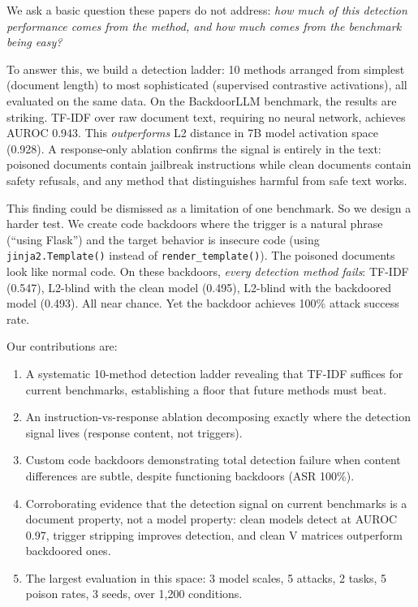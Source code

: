 \documentclass{article}
\begin{document}
We ask a basic question these papers do not address: \emph{how much of this detection performance comes from the method, and how much comes from the benchmark being easy?}

To answer this, we build a detection ladder: 10 methods arranged from simplest (document length) to most sophisticated (supervised contrastive activations), all evaluated on the same data. On the BackdoorLLM benchmark, the results are striking. TF-IDF over raw document text, requiring no neural network, achieves AUROC 0.943. This \emph{outperforms} L2 distance in 7B model activation space (0.928). A response-only ablation confirms the signal is entirely in the text: poisoned documents contain jailbreak instructions while clean documents contain safety refusals, and any method that distinguishes harmful from safe text works.

This finding could be dismissed as a limitation of one benchmark. So we design a harder test. We create code backdoors where the trigger is a natural phrase (``using Flask'') and the target behavior is insecure code (using \texttt{jinja2.Template()} instead of \texttt{render\_template()}). The poisoned documents look like normal code. On these backdoors, \emph{every detection method fails}: TF-IDF (0.547), L2-blind with the clean model (0.495), L2-blind with the backdoored model (0.493). All near chance. Yet the backdoor achieves 100\% attack success rate.

Our contributions are:

\begin{enumerate}
\item A systematic 10-method detection ladder revealing that TF-IDF suffices for current benchmarks, establishing a floor that future methods must beat.
\item An instruction-vs-response ablation decomposing exactly where the detection signal lives (response content, not triggers).
\item Custom code backdoors demonstrating total detection failure when content differences are subtle, despite functioning backdoors (ASR 100\%).
\item Corroborating evidence that the detection signal on current benchmarks is a document property, not a model property: clean models detect at AUROC 0.97, trigger stripping improves detection, and clean V matrices outperform backdoored ones.
\item The largest evaluation in this space: 3 model scales, 5 attacks, 2 tasks, 5 poison rates, 3 seeds, over 1,200 conditions.
\end{enumerate}
\end{document}
